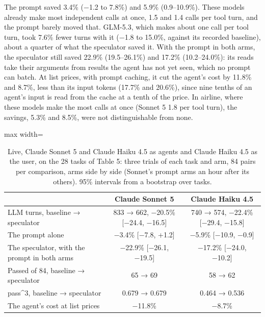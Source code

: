 \documentclass[10pt,twocolumn,letterpaper]{article}
\begin{document}
The prompt saved 3.4\% (−1.2 to 7.8\%) and 5.9\% (0.9--10.9\%). These models already make most independent calls at once, 1.5 and 1.4 calls per tool turn, and the prompt barely moved that. GLM-5.3, which makes about one call per tool turn, took 7.6\% fewer turns with it (−1.8 to 15.0\%, against its recorded baseline), about a quarter of what the speculator saved it. With the prompt in both arms, the speculator still saved 22.9\% (19.5--26.1\%) and 17.2\% (10.2--24.0\%): its reads take their arguments from results the agent has not yet seen, which no prompt can batch. At list prices, with prompt caching, it cut the agent's cost by 11.8\% and 8.7\%, less than its input tokens (17.7\% and 20.6\%), since nine tenths of an agent's input is read from the cache at a tenth of the price. In airline, where these models make the most calls at once (Sonnet 5 1.8 per tool turn), the savings, 5.3\% and 8.5\%, were not distinguishable from none.

\begin{table}[tp]
\centering\small
\renewcommand{\thetable}{5c}
\caption{Live, Claude Sonnet 5 and Claude Haiku 4.5 as agents and Claude Haiku 4.5 as the user, on the 28 tasks of Table 5: three trials of each task and arm, 84 pairs per comparison, arms side by side (Sonnet's prompt arms an hour after its others). 95\% intervals from a bootstrap over tasks.}
\label{tab:5c}
\begin{adjustbox}{max width=\linewidth}
\begin{tabular}{lcc}
\toprule
 & Claude Sonnet 5 & Claude Haiku 4.5 \\
\midrule
LLM turns, baseline → speculator & 833 → 662, −20.5\% {[}−24.4, −16.5{]} & 740 → 574, −22.4\% {[}−29.4, −15.8{]} \\
The prompt alone & −3.4\% {[}−7.8, +1.2{]} & −5.9\% {[}−10.9, −0.9{]} \\
The speculator, with the prompt in both arms & −22.9\% {[}−26.1, −19.5{]} & −17.2\% {[}−24.0, −10.2{]} \\
Passed of 84, baseline → speculator & 65 → 69 & 58 → 62 \\
pass\textasciicircum{}3, baseline → speculator & 0.679 → 0.679 & 0.464 → 0.536 \\
The agent's cost at list prices & −11.8\% & −8.7\% \\
\bottomrule
\end{tabular}
\end{adjustbox}
\end{table}
\end{document}
